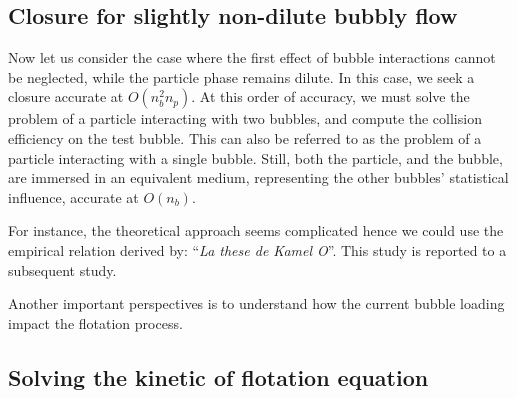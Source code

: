 \subsection{Closure for slightly non-dilute bubbly flow}

Now let us consider the case where the first effect of bubble interactions cannot be neglected, while the particle phase remains dilute. 
In this case, we seek a closure accurate at $O(n_b^2n_p)$. 
At this order of accuracy, we must solve the problem of a particle interacting with two bubbles, and compute the collision efficiency on the test bubble. 
This can also be referred to as the problem of a particle interacting with a single bubble. Still, both the particle, and the bubble, are immersed in an equivalent medium, representing the other bubbles' statistical influence, accurate at $O(n_b)$. 

For instance, the theoretical approach seems complicated hence we could use the empirical relation derived by: ``\textit{La these de Kamel O}''. 
This study is reported to a subsequent study. 

Another important perspectives is to understand how the current bubble loading impact the flotation process. 

\subsection{Solving the kinetic of flotation equation}

